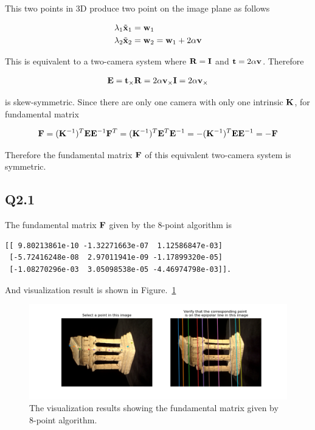 \documentclass[11pt]{article}
\begin{document}
This two points in 3D produce two point on the image plane as follows

\begin{align}
  \lambda_1\tilde{\mathbf{x}}_1 &= \mathbf{w}_1 \\
  \lambda_2\tilde{\mathbf{x}}_2 &= \mathbf{w}_2 = \mathbf{w}_1 + 2\alpha\mathbf{v}
\end{align}

This is equivalent to a two-camera system where $\mathbf{R}=\mathbf{I}$ and $\mathbf{t}=2\alpha\mathbf{v}$. Therefore

\begin{align}
  \mathbf{E} = \mathbf{t}_\times \mathbf{R} = 2\alpha\mathbf{v}_\times \mathbf{I}=2\alpha\mathbf{v}_\times
\end{align}

is skew-symmetric. Since there are only one camera with only one intrinsic $\mathbf{K}$, for fundamental matrix

\begin{align}
  \mathbf{F} = (\mathbf{K}^{-1})^T \mathbf{E} \mathbf{E}^{-1}
  \mathbf{F}^T = (\mathbf{K}^{-1})^T \mathbf{E}^T \mathbf{E}^{-1} = -(\mathbf{K}^{-1})^T \mathbf{E} \mathbf{E}^{-1} = -\mathbf{F}
\end{align}

Therefore the fundamental matrix $\mathbf{F}$ of this equivalent two-camera system is symmetric.

\newpage

\subsection*{Q2.1}

The fundamental matrix $\mathbf{F}$ given by the 8-point algorithm is

\begin{verbatim}
[[ 9.80213861e-10 -1.32271663e-07  1.12586847e-03]
 [-5.72416248e-08  2.97011941e-09 -1.17899320e-05]
 [-1.08270296e-03  3.05098538e-05 -4.46974798e-03]].
\end{verbatim}

And visualization result is shown in Figure.~\ref{fig:q2.1}

\begin{figure}[h!]
    \centering
    \includegraphics[width=.8\linewidth]{../results/q2_1.png}
    \caption{The visualization results showing the fundamental matrix given by 8-point algorithm. }
    \label{fig:q2.1}
\end{figure}
\end{document}
